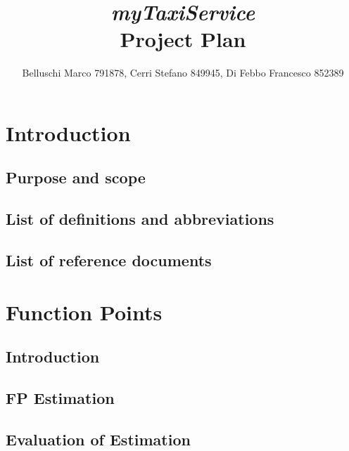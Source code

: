 \documentclass[]{report}
\begin{document}
\title{{\Huge\textit{myTaxiService}}\\{\Large Project Plan}}
\author{Belluschi Marco 791878, Cerri Stefano 849945, Di Febbo Francesco 852389}

\maketitle

\tableofcontents

\chapter{Introduction}

	\section{Purpose and scope}
	
	
	\section{List of definitions and abbreviations}
	

	\section{List of reference documents}
	

\chapter{Function Points}

	\section{Introduction}
	
	
	\section{FP Estimation}
	
	
	\section{Evaluation of Estimation}
	
\end{document}
